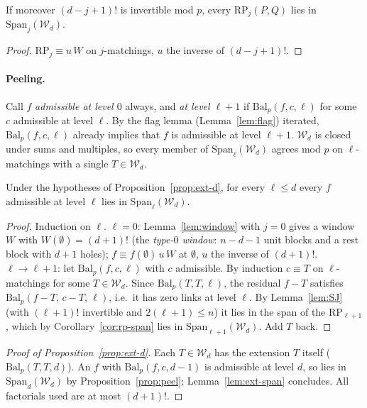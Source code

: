 \begin{corollary}\label{cor:rp-span}
If moreover $(d-j+1)!$ is invertible mod $p$, every $\mathrm{RP}_j(P,Q)$ lies in
$\mathrm{Span}_j(\mathcal W_d)$.
\end{corollary}

\begin{proof}
$\mathrm{RP}_j\equiv u\,W$ on $j$-matchings, $u$ the inverse of $(d-j+1)!$.
\end{proof}

\paragraph{Peeling.}
Call $f$ \emph{admissible at level $0$} always, and \emph{at level $\ell+1$} if
$\mathrm{Bal}_p(f,c,\ell)$ for some $c$ admissible at level $\ell$.  By the flag
lemma (Lemma~\ref{lem:flag}) iterated, $\mathrm{Bal}_p(f,c,\ell)$ already implies
that $f$ is admissible at level $\ell+1$.
$\mathcal W_d$ is closed under sums and multiples, so every member of
$\mathrm{Span}_\ell(\mathcal W_d)$ agrees mod $p$ on $\ell$-matchings with a single
$T\in\mathcal W_d$.

\begin{proposition}[peeling]\label{prop:peel}
Under the hypotheses of Proposition~\ref{prop:ext-d}, for every $\ell\le d$ every
$f$ admissible at level $\ell$ lies in
$\mathrm{Span}_\ell(\mathcal W_d)$.
\end{proposition}

\begin{proof}
Induction on $\ell$.  $\ell=0$: Lemma~\ref{lem:window} with $j=0$ gives a window $W$
with $W(\emptyset)=(d+1)!$ (the \emph{type-$0$ window}: $n-d-1$ unit blocks and a
rest block with $d+1$ holes); $f\equiv f(\emptyset)\,u\,W$ at $\emptyset$, $u$ the
inverse of $(d+1)!$.
$\ell\to\ell+1$: let $\mathrm{Bal}_p(f,c,\ell)$ with $c$ admissible.  By induction
$c\equiv T$ on $\ell$-matchings for some $T\in\mathcal W_d$.  Since
$\mathrm{Bal}_p(T,T,\ell)$, the residual $f-T$ satisfies
$\mathrm{Bal}_p(f-T,\,c-T,\,\ell)$, i.e.\ it has zero links at level $\ell$.  By
Lemma~\ref{lem:SJ} (with $(\ell+1)!$ invertible and $2(\ell+1)\le n$) it lies in the
span of the $\mathrm{RP}_{\ell+1}$, which by Corollary~\ref{cor:rp-span} lies in
$\mathrm{Span}_{\ell+1}(\mathcal W_d)$.  Add $T$ back.
\end{proof}

\begin{proof}[Proof of Proposition~\ref{prop:ext-d}]
Each $T\in\mathcal W_d$ has the extension $T$ itself ($\mathrm{Bal}_p(T,T,d)$).
An $f$ with $\mathrm{Bal}_p(f,c,d-1)$ is admissible at level $d$, so lies in
$\mathrm{Span}_d(\mathcal W_d)$ by Proposition~\ref{prop:peel};
Lemma~\ref{lem:ext-span} concludes.  All factorials used are at most $(d+1)!$.
\end{proof}


